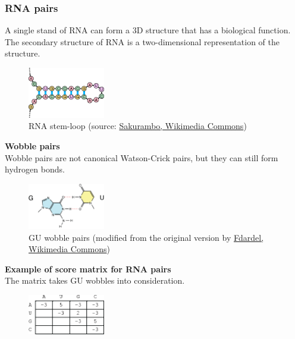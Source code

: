 %
%
\subsubsection*{RNA pairs}
A single stand of RNA can form a 3D structure that has a biological function. The secondary structure of RNA is a two-dimensional representation of the structure. 

\begin{figure}[H]
  \centering
      \includegraphics[width=0.3\textwidth]{fig03/rna_stem_loop.png}
  \caption{RNA stem-loop (source: \href{https://commons.wikimedia.org/w/index.php?curid=815268}{Sakurambo, Wikimedia Commons})}
\end{figure}

\noindent \textbf{Wobble pairs} \\
\noindent Wobble pairs are not canonical Watson-Crick pairs, but they can still form hydrogen bonds.

\begin{figure}[H]
  \centering
      \includegraphics[width=0.3\textwidth]{fig03/rna_gu_wobble.png}
  \caption{GU wobble pairs \newline (modified  from the original version by \href{https://commons.wikimedia.org/w/index.php?curid=2636730}{Fdardel, Wikimedia Commons})}
\end{figure}

\noindent \textbf{Example of score matrix for RNA pairs} \\
\noindent The matrix takes GU wobbles into consideration.

\begin{figure}[H]
  \centering
      \includegraphics[width=0.3\textwidth]{fig03/example_rna_score_matrix.png}
\end{figure}


